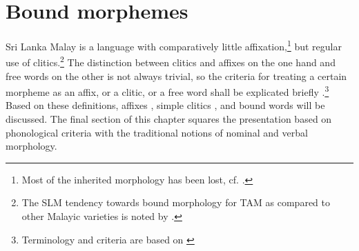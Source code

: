 \glossSTDmode

\chapter{Bound morphemes}\label{sec:form:Clitics}
Sri Lanka Malay is a language with comparatively little affixation,\footnote{Most of the inherited morphology has been lost, cf. \citet{Adelaar1991}.} but regular use of clitics.\footnote{The SLM tendency towards bound morphology for TAM  as compared to other Malayic varieties is noted by \citet{Ansaldo2005ms}.} The distinction between clitics and affixes on the one hand and free words on the other  is not always trivial, so the criteria for treating a certain morpheme as an affix, or a clitic, or a free word shall be explicated briefly .\footnote{Terminology and criteria are based on \citet{Zwicky1977, ZwickyEtAl1983}} Based on these definitions,
affixes ,
simple clitics ,
and bound words 
 will be discussed. The final section of this chapter  squares the presentation based on phonological criteria with the traditional notions of nominal and verbal morphology.

